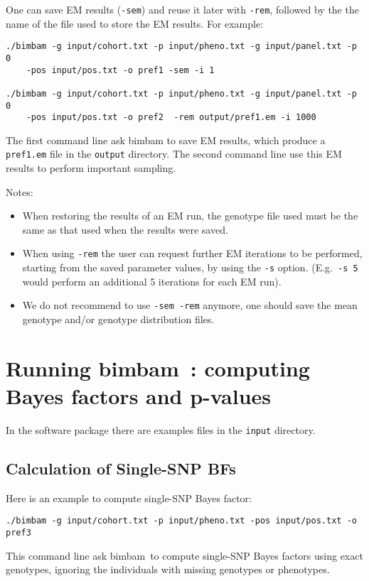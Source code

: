 \documentclass[11pt,Palatino]{article}
\def\bimbam{{\sc bimbam}~}
\begin{document}
One can save EM results ({\tt -sem}) and reuse it later with {\tt -rem}, followed by the
the name of the file used to store the EM results.
For example:
\begin{verbatim}
./bimbam -g input/cohort.txt -p input/pheno.txt -g input/panel.txt -p 0 
    -pos input/pos.txt -o pref1 -sem -i 1

./bimbam -g input/cohort.txt -p input/pheno.txt -g input/panel.txt -p 0 
    -pos input/pos.txt -o pref2  -rem output/pref1.em -i 1000
\end{verbatim}
The first command line ask bimbam to save EM results, which produce a {\tt pref1.em} file in the {\tt output} directory. The second command line use this EM results to perform important sampling. 

Notes:
\begin{itemize}
\item When restoring the results of an EM run, the genotype file used must be the same as that
used when the results were saved.
\item When using {\tt -rem} the user can request further EM iterations to be performed, starting
from the saved parameter values, by using the {\tt -s} option. (E.g.~{\tt -s 5} would perform an additional
5 iterations for each EM run).
\item We do not recommend to use {\tt -sem -rem} anymore, one should save the mean genotype and/or genotype distribution files. 
\end{itemize}


\section{Running \bimbam: computing Bayes factors and p-values}
In the software package there are examples files in the {\tt input} directory. 
\subsection{Calculation of Single-SNP BFs}
Here is an example to compute single-SNP Bayes factor: 
\begin{verbatim}
./bimbam -g input/cohort.txt -p input/pheno.txt -pos input/pos.txt -o pref3
\end{verbatim}
This command line ask \bimbam to compute single-SNP Bayes factors using exact genotypes, ignoring the individuals with missing genotypes or phenotypes. 
\end{document}
